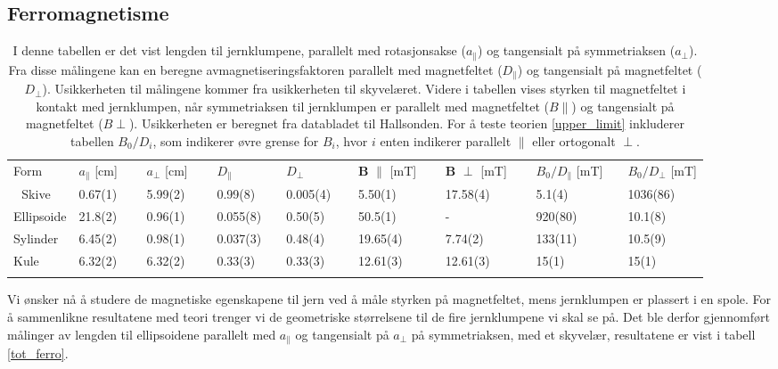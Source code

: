 \documentclass[%
 reprint,
nofootinbib,
aps,
]{revtex4-1}
\begin{document}
\subsection{Ferromagnetisme}
\begin{table}\renewcommand{\arraystretch}{1.2}
\centering
\caption{I denne tabellen er det vist lengden til jernklumpene, parallelt med rotasjonsakse ($a_{\parallel}$) og tangensialt på symmetriaksen ($a_{\perp}$). Fra disse målingene kan en beregne avmagnetiseringsfaktoren parallelt med magnetfeltet ($D_{\parallel}$) og tangensialt på magnetfeltet ($D_{\perp}$). Usikkerheten til målingene kommer fra usikkerheten til skyvelæret. Videre i tabellen vises styrken til magnetfeltet i kontakt med jernklumpen, når symmetriaksen til jernklumpen er parallelt med magnetfeltet ($B\parallel$) og tangensialt på magnetfeltet ($B\perp$). Usikkerheten er beregnet fra databladet til Hallsonden. For å teste teorien \eqref{upper_limit} inkluderer tabellen $B_0/D_i$, som indikerer øvre grense for $B_i$, hvor $i$ enten indikerer parallelt $\parallel$ eller ortogonalt $\perp$.}
\label{tot_ferro}
\begin{tabular}{@{}lllllllll@{}}
\botrule
Form & $a_{\parallel}$ {[}cm{]} $\quad$  & $a_{\perp}$ {[}cm{]} $\quad$  & $D_{\parallel}$ $\qquad \quad$ & $D_{\perp}$ $\qquad\quad$ &  $\bm{B}$  $\parallel$ {[}mT{]} $\quad$ & $\bm{B}$ $\perp$ {[}mT{]} $\quad$ & $B_0/D_{\parallel}$ [mT]$\quad$  & $B_0/D_{\perp}$ [mT]\\ \colrule 
Skive      & 0.67(1)        & 5.99(2)           & 0.99(8)         & 0.005(4) & 5.50(1)                           & 17.58(4)         &    5.1(4)  &  1036(86)      \\
Ellipsoide & 21.8(2)        & 0.96(1)           & 0.055(8)        & 0.50(5) & 50.5(1)                           & -                &   920(80)    & 10.1(8)       \\
Sylinder   & 6.45(2)        & 0.98(1)           & 0.037(3)        & 0.48(4) & 19.65(4)                          & 7.74(2)          &   133(11)    &10.5(9)           \\
Kule       & 6.32(2)        & 6.32(2)           & 0.33(3)         & 0.33(3) & 12.61(3)            & 12.61(3)                &   15(1)  & 15(1)        \\ \botrule
\end{tabular}
\end{table}
Vi ønsker nå å studere de magnetiske egenskapene til jern ved å måle styrken på magnetfeltet, mens jernklumpen er plassert i en spole. For å sammenlikne resultatene med teori trenger vi de geometriske størrelsene til de fire jernklumpene vi skal se på. Det ble derfor gjennomført målinger av lengden til ellipsoidene parallelt med $a_{\parallel}$ og tangensialt på $a_{\perp}$ på symmetriaksen, med et skyvelær, resultatene er vist  i tabell \vref{tot_ferro}.
\end{document}
